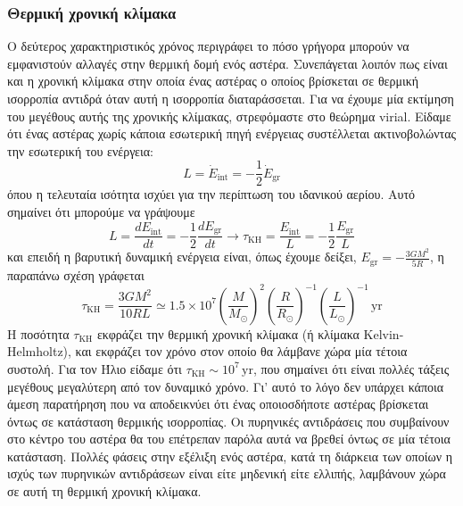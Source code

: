 \subsubsection{Θερμική χρονική κλίμακα}
Ο δεύτερος χαρακτηριστικός χρόνος περιγράφει το πόσο γρήγορα μπορούν να εμφανιστούν αλλαγές στην θερμική δομή ενός αστέρα. Συνεπάγεται λοιπόν πως είναι και η χρονική κλίμακα στην οποία ένας αστέρας ο οποίος βρίσκεται σε θερμική ισορροπία αντιδρά όταν αυτή η ισορροπία διαταράσσεται. Για να έχουμε μία εκτίμηση του μεγέθους αυτής της χρονικής κλίμακας, στρεφόμαστε στο θεώρημα virial. Είδαμε ότι ένας αστέρας χωρίς κάποια εσωτερική πηγή ενέργειας συστέλλεται ακτινοβολώντας την εσωτερική του ενέργεια:
$$L = \dot{E}_{\text{int}} = - \frac{1}{2} \dot{E}_{\text{gr}}$$
όπου η τελευταία ισότητα ισχύει για την περίπτωση του ιδανικού αερίου.
Αυτό σημαίνει ότι μπορούμε να γράψουμε
\begin{equation*}
    L = \frac{d E_{\text{int}}}{dt} = - \frac{1}{2} \frac{d E_{\text{gr}}}{dt} \longrightarrow \tau_{\text{KH}} = \frac{E_{\text{int}}}{L} = - \frac{1}{2} \frac{E_{\text{gr}}}{L}
\end{equation*}
και επειδή η βαρυτική δυναμική ενέργεια είναι, όπως έχουμε δείξει, $E_{\text{gr}} = - \frac{3GM^2}{5R}$, η παραπάνω σχέση γράφεται
\begin{equation}
    \label{eq:thermal_timescale}
    \tau_{\text{KH}} = \frac{3GM^2}{10RL} \simeq 1.5 \times 10^7 \left( \frac{M}{M_{\odot}} \right)^2 \left( \frac{R}{R_{\odot}} \right)^{-1} \left( \frac{L}{L_{\odot}} \right)^{-1} \,\text{yr}
\end{equation}
Η ποσότητα $\tau_{\text{KH}}$ εκφράζει την θερμική χρονική κλίμακα (ή κλίμακα Kelvin-Helmholtz), και εκφράζει τον χρόνο στον οποίο θα λάμβανε χώρα μία τέτοια συστολή. Για τον Ήλιο είδαμε ότι $\tau_{\text{KH}} \sim 10^7 \,\text{yr}$, που σημαίνει ότι είναι πολλές τάξεις μεγέθους μεγαλύτερη από τον δυναμικό χρόνο. Γι' αυτό το λόγο δεν υπάρχει κάποια άμεση παρατήρηση που να αποδεικνύει ότι ένας οποιοσδήποτε αστέρας βρίσκεται όντως σε κατάσταση θερμικής ισορροπίας. Οι πυρηνικές αντιδράσεις που συμβαίνουν στο κέντρο του αστέρα θα του επέτρεπαν παρόλα αυτά να βρεθεί όντως σε μία τέτοια κατάσταση. Πολλές φάσεις στην εξέλιξη ενός αστέρα, κατά τη διάρκεια των οποίων η ισχύς των πυρηνικών αντιδράσεων είναι είτε μηδενική είτε ελλιπής, λαμβάνουν χώρα σε αυτή τη θερμική χρονική κλίμακα.
